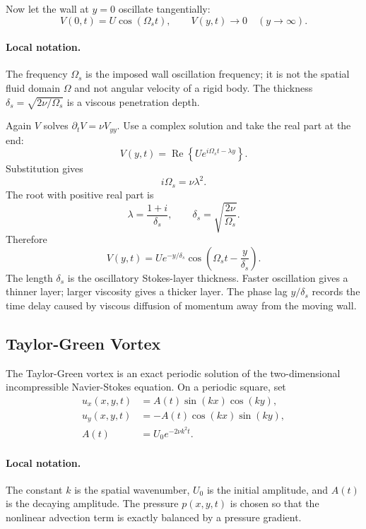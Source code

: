 Now let the wall at \(y=0\) oscillate tangentially:
\[
  V(0,t)=U\cos(\Omega_s t),
  \qquad
  V(y,t)\to0\quad(y\to\infty).
\]

\paragraph{Local notation.}
The frequency \(\Omega_s\) is the imposed wall oscillation frequency; it is not
the spatial fluid domain \(\Omega\) and not angular velocity of a rigid body.
The thickness \(\delta_s=\sqrt{2\nu/\Omega_s}\) is a viscous penetration
depth.

Again \(V\) solves \(\partial_tV=\nu V_{yy}\). Use a complex solution and take
the real part at the end:
\[
  V(y,t)=\operatorname{Re}\left\{U e^{i\Omega_s t-\lambda y}\right\}.
\]
Substitution gives
\[
  i\Omega_s=\nu\lambda^2.
\]
The root with positive real part is
\[
  \lambda=\frac{1+i}{\delta_s},
  \qquad
  \delta_s=\sqrt{\frac{2\nu}{\Omega_s}}.
\]
Therefore
\[
  \boxed{
  V(y,t)=U e^{-y/\delta_s}
  \cos\left(\Omega_s t-\frac{y}{\delta_s}\right).
  }
\]
The length \(\delta_s\) is the oscillatory Stokes-layer thickness. Faster
oscillation gives a thinner layer; larger viscosity gives a thicker layer. The
phase lag \(y/\delta_s\) records the time delay caused by viscous diffusion of
momentum away from the moving wall.

\subsection{Taylor-Green Vortex}
\label{subsec:taylor-green-vortex}

The Taylor-Green vortex is an exact periodic solution of the two-dimensional
incompressible Navier-Stokes equation. On a periodic square, set
\[
\begin{aligned}
  u_x(x,y,t)&=A(t)\sin(kx)\cos(ky),\\
  u_y(x,y,t)&=-A(t)\cos(kx)\sin(ky),\\
  A(t)&=U_0e^{-2\nu k^2t}.
\end{aligned}
\]

\paragraph{Local notation.}
The constant \(k\) is the spatial wavenumber, \(U_0\) is the initial amplitude,
and \(A(t)\) is the decaying amplitude.  The pressure \(p(x,y,t)\) is chosen so
that the nonlinear advection term is exactly balanced by a pressure gradient.

